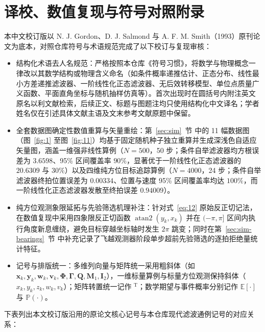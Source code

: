 \section{译校、数值复现与符号对照附录}\label{sec:audit}

本中文校订版以 N. J. Gordon、D. J. Salmond 与 A. F. M. Smith（1993）原刊论文为底本，对照仓库符号与术语规范完成了以下校订与复现审核：

\begin{itemize}
\item 结构化术语去人名规范：严格按照本仓库《符号习惯》，将数学与物理概念一律改以其数学结构或物理含义命名（如条件概率递推估计、正态分布、线性最小方差递推滤波器、一阶线性化正态滤波器、无后效转移模型、单位点质量广义函数、平面直角坐标与随机抽样仿真等）。首次出现时在圆括号内附注英文原名以利文献检索，后续正文、标题与图题注均只使用结构化中文译名；学者姓名仅在引述具体文献主语及文末参考文献原题中保留。
\item 全套数据图确定性数值重算与矢量重绘：第~\ref{sec:sim}~节 中的 11 幅数据图（图~\ref{fig:1} 至图~\ref{fig:11}）均基于固定随机种子独立重算并生成深浅色自适应矢量图，涵盖一维强非线性算例（$N = 500$，50 步；条件自举滤波器均方根误差为 $3.6598$、95\% 区间覆盖率 $90\%$，显著优于一阶线性化正态滤波器的 $20.6309$ 与 $30\%$）以及四维纯方位目标追踪算例（$N = 4000$，24 步；条件自举滤波器终拍位置误差为 $0.00334$、位置与速度 95\% 区间覆盖率均达 $100\%$，而一阶线性化正态滤波器发散至终拍误差 $0.94009$）。
\item 纯方位观测象限延拓与先验筛选机理补注：针对式~\eqref{eq:12} 原始反正切记法，在数值复现中采用四象限反正切函数 $\operatorname{atan2}(y_k, x_k)$ 并在 $(-\pi, \pi]$ 区间内执行角度新息缠绕，避免目标穿越坐标轴时发生 $2\pi$ 跳变；同时在第~\ref{sec:sim-bearings}~节 中补充记录了飞越观测器阶段单步超前先验筛选的逐拍拒绝量统计特征。
\item 记号与排版统一：多维列向量与矩阵统一采用粗斜体（如 $\bm{x}_k, \bm{y}_k, \bm{w}_k, \bm{v}_k, \bm{\Phi}, \bm{\Gamma}, \bm{Q}, \bm{M}_1, \bm{I}_2$），一维标量算例与标量方位观测保持斜体（$x_k, y_k, z_k, w_k, v_k$）；矩阵转置统一记作 ${}^{\mathrm{T}}$；数学期望与事件概率分别记作 $\mathbb{E}[\cdot]$ 与 $\mathbb{P}(\cdot)$。
\end{itemize}

下表列出本文校订版沿用的原论文核心记号与本仓库现代滤波通例记号的对应关系：

